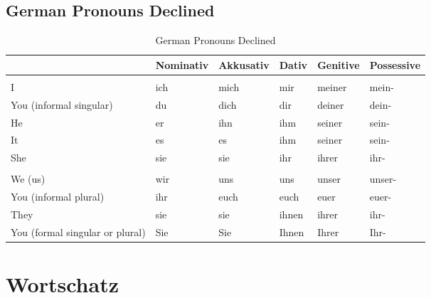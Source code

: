 \documentclass{article}
\begin{document}
\subsection{German Pronouns Declined}
\begin{table}[h!]
  \centering
  \caption{German Pronouns Declined}
  \label{tab:table1}
  \begin{tabular}{p{5cm}p{2cm}p{2cm}p{2cm}p{2cm}p{2cm}}
    \toprule
 & Nominativ & Akkusativ & Dativ & Genitive & Possessive\\
     \midrule
\rowcolor{Gray}
\multicolumn{6}{c}{\textbf{Singular}}\\
I &ich &mich &mir &meiner &mein-\\
You (informal singular) &du &dich &dir &deiner &dein-\\
He &er &ihn &ihm &seiner &sein-\\
It &es &es &ihm &seiner &sein-\\
She &sie &sie &ihr &ihrer &ihr-\\
    \rowcolor{Gray}
\multicolumn{6}{c}{\textbf{Plural}}\\
We (us) &wir &uns &uns &unser &unser-\\
You (informal plural) &ihr &euch &euch &euer &euer-\\
They &sie &sie &ihnen &ihrer &ihr-\\
You (formal singular or plural) &Sie &Sie &Ihnen &Ihrer &Ihr-\\
    \bottomrule
  \end{tabular}
\end{table}

\newpage
\section{Wortschatz}
\end{document}
